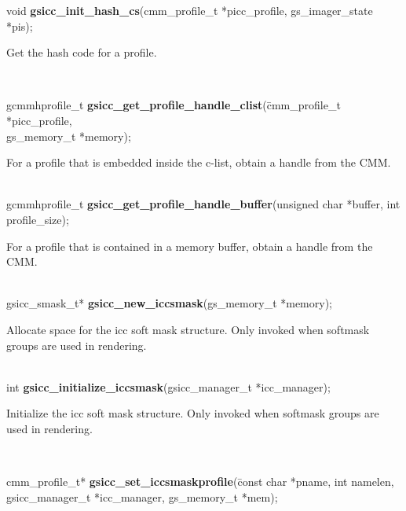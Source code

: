 \documentclass[12pt,notitlepage]{article}
\begin{document}
\noindent void {\bf gsicc\_init\_hash\_cs}(cmm\_profile\_t *picc\_profile, gs\_imager\_state *pis);\\

\begin{minipage}[h]{6.0in}
Get the hash code for a profile.
\end{minipage}\\

\begin{tabbing}
\noindent gcmmhprofile\_t {\bf gsicc\_get\_profile\_handle\_clist}(\=cmm\_profile\_t *picc\_profile, \\
\>gs\_memory\_t *memory);\\
\end{tabbing}

\begin{minipage}[h]{6.0in}
For a profile that is embedded inside the c-list, obtain a handle from the CMM.
\end{minipage}\\

\noindent gcmmhprofile\_t {\bf gsicc\_get\_profile\_handle\_buffer}(unsigned char *buffer, int profile\_size);\\

\begin{minipage}[h]{6.0in}
For a profile that is contained in a memory buffer, obtain a handle from the CMM.
\end{minipage}\\

\noindent gsicc\_smask\_t* {\bf gsicc\_new\_iccsmask}(gs\_memory\_t *memory);\\

\begin{minipage}[h]{6.0in}
Allocate space for the icc soft mask structure.  Only invoked when softmask groups are used in rendering.
\end{minipage}\\

\noindent int {\bf gsicc\_initialize\_iccsmask}(gsicc\_manager\_t *icc\_manager);\\

\begin{minipage}[h]{6.0in}
Initialize the icc soft mask structure.   Only invoked when softmask groups are used in rendering.
\end{minipage}\\

\begin{tabbing}
\noindent cmm\_profile\_t* {\bf  gsicc\_set\_iccsmaskprofile}(\=const char *pname, int namelen, \\
\>gsicc\_manager\_t *icc\_manager, gs\_memory\_t *mem);\\
\end{tabbing}
\end{document}
